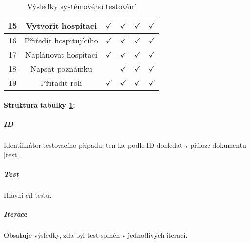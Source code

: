 \begin{table}[h]
\begin{center}
\begin{tabular}{|c|c||c|c|c|c|}
\hline 
15 & Vytvořit hospitaci & $\checkmark$ & $\checkmark$ & $\checkmark$ & $\checkmark$ \\ 
\hline 
16 & Přiřadit hospitujícího & $\checkmark$ & $\checkmark$ & $\checkmark$ & $\checkmark$ \\ 
\hline 
17 & Naplánovat hospitaci & $\checkmark$ & $\checkmark$ & $\checkmark$ & $\checkmark$ \\ 
\hline 
18 & Napsat poznámku &  & $\checkmark$ & $\checkmark$ & $\checkmark$ \\ 
\hline 
19 & Přiřadit roli & $\checkmark$ & $\checkmark$ & $\checkmark$ & $\checkmark$ \\ 
\hline 
\end{tabular} 
\caption{Výsledky systémového testování}
\label{tab:test}
\end{center}
\end{table}

\paragraph{Struktura tabulky \ref{tab:test}:}
\subparagraph*{ID}
Identifikátor testovacího případu, ten lze podle ID dohledat v příloze dokumentu \ref{test}.
\subparagraph*{Test}
Hlavní cíl testu.
\subparagraph*{Iterace}
Obsahuje výsledky, zda byl test splněn v jednotlivých iterací.


